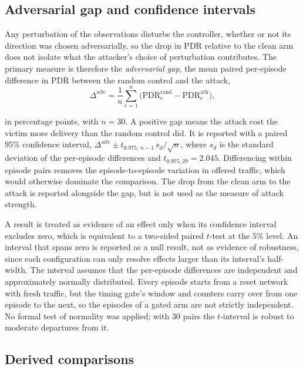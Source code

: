 \subsection{Adversarial gap and confidence intervals}
\label{subsec:analysis_gap}

Any perturbation of the observations disturbs the controller, whether or not its
direction was chosen adversarially, so the drop in PDR relative to the clean arm does
not isolate what the attacker's choice of perturbation contributes. The primary measure
is therefore the \emph{adversarial gap}, the mean paired per-episode difference in PDR
between the random control and the attack,
\begin{equation}
  \Delta^{\text{adv}} = \frac{1}{n} \sum_{e=1}^{n}
    \Big( \mathrm{PDR}^{\text{rand}}_{e} - \mathrm{PDR}^{\text{atk}}_{e} \Big),
  \label{eq:adversarial_gap}
\end{equation}

\noindent in percentage points, with $n = 30$. A positive gap means the attack cost the
victim more delivery than the random control did. It is reported with a paired $95\%$
confidence interval, $\Delta^{\text{adv}} \pm t_{0.975,\,n-1}\, s_d / \sqrt{n}$, where
$s_d$ is the standard deviation of the per-episode differences and
$t_{0.975,29} = 2.045$. Differencing within episode pairs removes the
episode-to-episode variation in offered traffic, which would otherwise dominate the
comparison. The drop from the clean arm to the attack is reported alongside the gap,
but is not used as the measure of attack strength.

A result is treated as evidence of an effect only when its confidence interval excludes
zero, which is equivalent to a two-sided paired $t$-test at the $5\%$ level. An interval
that spans zero is reported as a null result, not as evidence of robustness, since each
configuration can only resolve effects larger than its interval's half-width. The
interval assumes that the per-episode differences are independent and approximately
normally distributed. Every episode starts from a reset network with fresh traffic, but
the timing gate's window and counters carry over from one episode to the next, so the
episodes of a gated arm are not strictly independent. No formal test of normality was
applied; with 30 pairs the $t$-interval is robust to moderate departures from it.

\subsection{Derived comparisons}
\label{subsec:analysis_comparisons}


